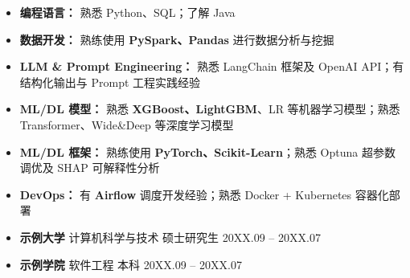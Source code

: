\documentclass[zh]{resume}
\begin{document}
\makeheader

\begin{abstract}
    \hspace{-2em}X 年算法经验，专注推荐系统、用户价值建模与用户分群。具备从特征工程到模型部署的全链路 ML Pipeline 构建经验，熟悉主流云平台的工程化落地。
\end{abstract}

\begin{itemize}
    \item \textbf{编程语言：} 熟悉 Python、SQL；了解 Java
    \item \textbf{数据开发：} 熟练使用 \textbf{PySpark、Pandas} 进行数据分析与挖掘
    \item \textbf{LLM \& Prompt Engineering：} 熟悉 LangChain 框架及 OpenAI API；有结构化输出与 Prompt 工程实践经验
    \item \textbf{ML/DL 模型：} 熟悉 \textbf{XGBoost、LightGBM}、LR 等机器学习模型；熟悉 Transformer、Wide\&Deep 等深度学习模型
    \item \textbf{ML/DL 框架：} 熟练使用 \textbf{PyTorch、Scikit-Learn}；熟悉 Optuna 超参数调优及 SHAP 可解释性分析
    \item \textbf{DevOps：} 有 \textbf{Airflow} 调度开发经验；熟悉 Docker + Kubernetes 容器化部署
\end{itemize}

\begin{itemize}
    \item \textbf{示例大学} \quad 计算机科学与技术 \quad 硕士研究生 \hfill 20XX.09 -- 20XX.07
    \item \textbf{示例学院} \quad 软件工程 \quad 本科 \hfill 20XX.09 -- 20XX.07
\end{itemize}
\end{document}
